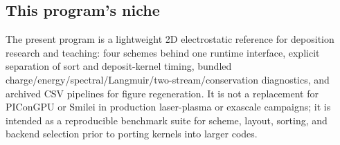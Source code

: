 \subsection{This program's niche}
The present program is a lightweight 2D electrostatic reference for deposition research and teaching: four schemes behind one runtime interface, explicit separation of sort and deposit-kernel timing, bundled charge/energy/spectral/Langmuir/two-stream/conservation diagnostics, and archived CSV pipelines for figure regeneration.
It is not a replacement for PIConGPU or Smilei in production laser-plasma or exascale campaigns; it is intended as a reproducible benchmark suite for scheme, layout, sorting, and backend selection prior to porting kernels into larger codes.
